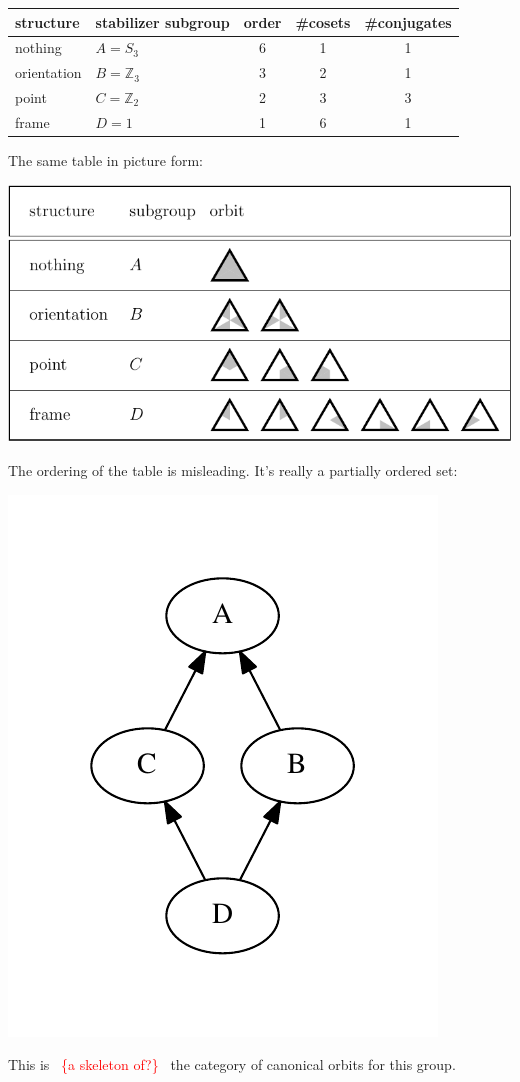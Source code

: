 \documentclass[11pt,oneside]{article}
\newcommand{\todo}[1]{\ \textcolor{red}{\{#1\}}\ }
\newcommand{\Integer}{\mathbb{Z}}
\begin{document}
\begin{samepage}
\begin{center}
\begin{tabular}{ |l|l|c|c|c| }
\hline
structure & stabilizer subgroup & order & \#cosets & \#conjugates \\
\hline
\hline
nothing & $A=S_3$ &       6        &  1      &   1         \\
\hline
orientation &$B=\Integer_3$ &       3        &  2      &   1         \\
\hline
point & $C=\Integer_2$ &       2        &  3      &   3         \\
\hline
frame & $D=1$ &       1        &  6      &   1         \\
\hline
\end{tabular}
\end{center}
\end{samepage}

The same table in picture form:
\begin{center}
\includegraphics[]{pic-triangle-structures.pdf} 
\end{center}

The ordering of the table is misleading.
It's really a partially ordered set:
\begin{center}
\includegraphics[width=0.3\columnwidth]{subgroups_s3.pdf} 
\end{center}
This is \todo{a skeleton of?} the category of canonical orbits
for this group.
\end{document}
